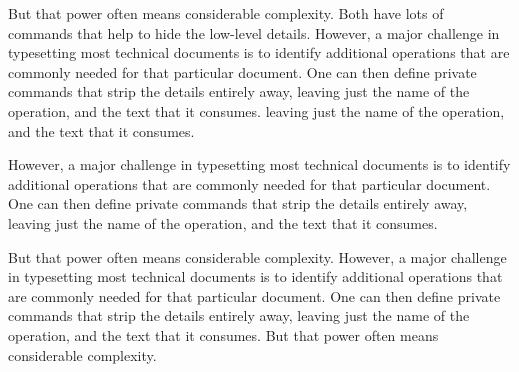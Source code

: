 \fontfam[cloister]

\startcanonpage{28pc}
\typosize[11/13]
\noindent But that power often means considerable complexity. 
Both have lots of commands that help to hide the low-level details. 
However, a major challenge in typesetting most technical documents is to identify additional operations that are commonly needed for that particular document. One can then define private commands that strip the details entirely away, leaving just the name of the operation, and the text that it consumes. leaving just the name of the operation, and the text that it consumes.

However, a major challenge in typesetting most technical documents is to identify additional operations that are commonly needed for that particular document. One can then define private commands that strip the details entirely away, leaving just the name of the operation, and the text that it consumes.

{But that power often means considerable complexity. 
However, a major challenge in typesetting most technical documents is to identify additional operations that are commonly needed for that particular document. One can then define private commands that strip the details entirely away, leaving just the name of the operation, and the text that it consumes. But that power often means considerable complexity. \parfillskip=0pt\par}
\vfil

\stopcanonpage



